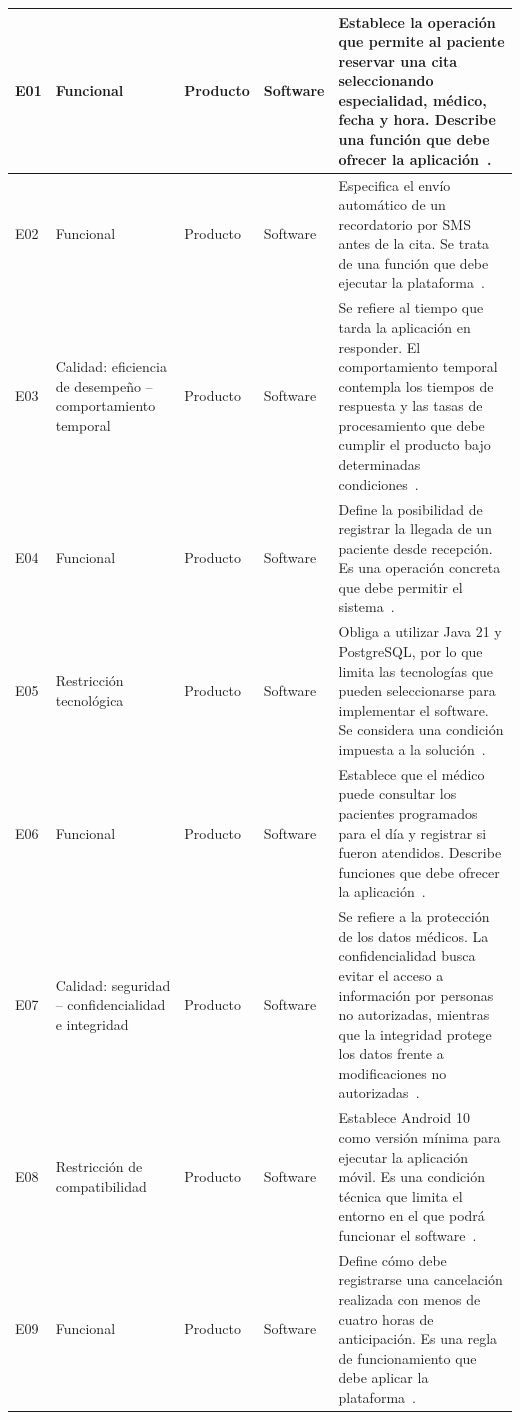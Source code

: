 \begin{longtable}{|L{0.08\tw}|L{0.23\tw}|L{0.12\tw}|L{0.12\tw}|L{0.45\tw}|}
E01 & Funcional & Producto & Software & Establece la operación que permite al paciente reservar una cita seleccionando especialidad, médico, fecha y hora. Describe una función que debe ofrecer la aplicación~\cite{iso29148}. \\ \hline
E02 & Funcional & Producto & Software & Especifica el envío automático de un recordatorio por SMS antes de la cita. Se trata de una función que debe ejecutar la plataforma~\cite{iso29148}. \\ \hline
E03 & Calidad: eficiencia de desempeño – comportamiento temporal & Producto & Software & Se refiere al tiempo que tarda la aplicación en responder. El comportamiento temporal contempla los tiempos de respuesta y las tasas de procesamiento que debe cumplir el producto bajo determinadas condiciones~\cite{iso25010}. \\ \hline
E04 & Funcional & Producto & Software & Define la posibilidad de registrar la llegada de un paciente desde recepción. Es una operación concreta que debe permitir el sistema~\cite{iso29148}. \\ \hline
E05 & Restricción tecnológica & Producto & Software & Obliga a utilizar Java 21 y PostgreSQL, por lo que limita las tecnologías que pueden seleccionarse para implementar el software. Se considera una condición impuesta a la solución~\cite{iso29148}. \\ \hline
E06 & Funcional & Producto & Software & Establece que el médico puede consultar los pacientes programados para el día y registrar si fueron atendidos. Describe funciones que debe ofrecer la aplicación~\cite{iso29148}. \\ \hline
E07 & Calidad: seguridad – confidencialidad e integridad & Producto & Software & Se refiere a la protección de los datos médicos. La confidencialidad busca evitar el acceso a información por personas no autorizadas, mientras que la integridad protege los datos frente a modificaciones no autorizadas~\cite{iso25010}. \\ \hline
E08 & Restricción de compatibilidad & Producto & Software & Establece Android 10 como versión mínima para ejecutar la aplicación móvil. Es una condición técnica que limita el entorno en el que podrá funcionar el software~\cite{iso29148}. \\ \hline
E09 & Funcional & Producto & Software & Define cómo debe registrarse una cancelación realizada con menos de cuatro horas de anticipación. Es una regla de funcionamiento que debe aplicar la plataforma~\cite{iso29148}. \\ \hline

\end{longtable}
